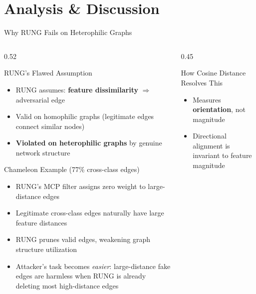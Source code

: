 \documentclass[aspectratio=169]{beamer}
\begin{document}
\section{Analysis \& Discussion}

\begin{frame}{Why RUNG Fails on Heterophilic Graphs}
  \tiny
  \begin{columns}[T]
    \begin{column}{0.52\textwidth}
      \begin{alertblock}{RUNG's Flawed Assumption}
        \begin{itemize}
          \item RUNG assumes: \textbf{feature dissimilarity} $\Rightarrow$ adversarial edge
          \item Valid on homophilic graphs (legitimate edges connect similar nodes)
          \item \textbf{Violated on heterophilic graphs} by genuine network structure
        \end{itemize}
      \end{alertblock}
      \vspace{6pt}
      \begin{block}{Chameleon Example (77\% cross-class edges)}
        \begin{itemize}
          \item RUNG's MCP filter assigns zero weight to large-distance edges
          \item Legitimate cross-class edges naturally have large feature distances
          \item RUNG prunes valid edges, weakening graph structure utilization
          \item Attacker's task becomes \emph{easier}: large-distance fake edges are harmless when RUNG is already deleting most high-distance edges
        \end{itemize}
      \end{block}
    \end{column}
    \begin{column}{0.45\textwidth}
      \begin{block}{How Cosine Distance Resolves This}
        \begin{itemize}
          \item Measures \textbf{orientation}, not magnitude
          \item Directional alignment is invariant to feature magnitude

\end{itemize}
\end{block}
\end{column}
\end{columns}
\end{frame}
\end{document}
